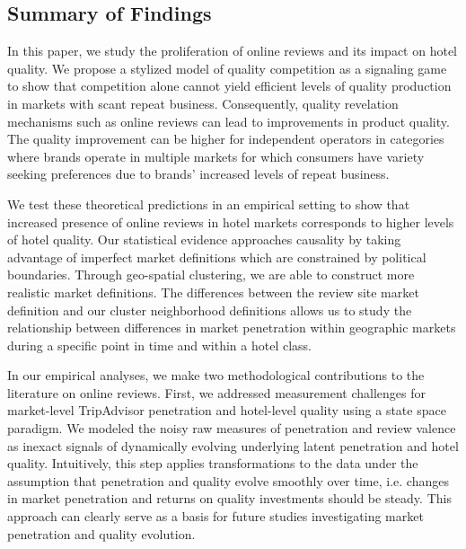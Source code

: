 \documentclass{informs_mod} %
\begin{document}
\subsection{Summary of Findings}

In this paper, we study the proliferation of online reviews and its impact on hotel quality. We propose a stylized model of quality competition as a signaling game to show that competition alone cannot yield efficient levels of quality production in markets with scant repeat business. Consequently, quality revelation mechanisms such as online reviews can lead to improvements in product quality. The quality improvement can be higher for independent operators in categories where brands operate in multiple markets for which consumers have variety seeking preferences due to brands' increased levels of repeat business. 

We test these theoretical predictions in an empirical setting to show that increased presence of online reviews in hotel markets corresponds to higher levels of hotel quality. Our statistical evidence approaches causality by taking advantage of imperfect market definitions which are constrained by political boundaries. Through geo-spatial clustering, we are able to construct more realistic market definitions. The differences between the review site market definition and our cluster neighborhood definitions allows us to study the relationship between differences in market penetration within geographic markets during a specific point in time and within a hotel class.

In our empirical analyses, we make two methodological contributions to the literature on online reviews. First, we addressed measurement challenges for market-level TripAdvisor penetration and hotel-level quality using a state space paradigm. We modeled the noisy raw measures of penetration and review valence as inexact signals of dynamically evolving underlying latent penetration and hotel quality. Intuitively, this step applies transformations to the data under the assumption that penetration and quality evolve smoothly over time, i.e. changes in market penetration and returns on quality investments should be steady. This approach can clearly serve as a basis for future studies investigating market penetration and quality evolution.
\end{document}
